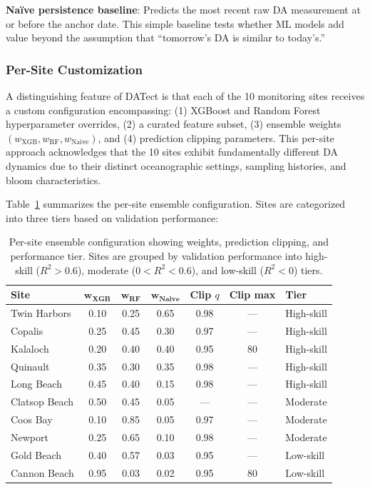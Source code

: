 \documentclass[preprint,12pt,authoryear]{elsarticle}
\begin{document}
\textbf{Na\"ive persistence baseline}: Predicts the most recent raw DA measurement at or before the anchor date. This simple baseline tests whether ML models add value beyond the assumption that ``tomorrow's DA is similar to today's.''

\subsubsection{Per-Site Customization}

A distinguishing feature of DATect is that each of the 10 monitoring sites receives a custom configuration encompassing: (1) XGBoost and Random Forest hyperparameter overrides, (2) a curated feature subset, (3) ensemble weights $(w_{\text{XGB}}, w_{\text{RF}}, w_{\text{Naive}})$, and (4) prediction clipping parameters. This per-site approach acknowledges that the 10 sites exhibit fundamentally different DA dynamics due to their distinct oceanographic settings, sampling histories, and bloom characteristics.

Table~\ref{tab:ensemble-config} summarizes the per-site ensemble configuration. Sites are categorized into three tiers based on validation performance:

\begin{table}[!htbp]
\centering
\caption{Per-site ensemble configuration showing weights, prediction clipping, and performance tier. Sites are grouped by validation performance into high-skill ($R^2 > 0.6$), moderate ($0 < R^2 < 0.6$), and low-skill ($R^2 < 0$) tiers.}
\label{tab:ensemble-config}
\small
\begin{tabular}{@{}lcccccl@{}}
\toprule
\textbf{Site} & $\boldsymbol{w_{\text{XGB}}}$ & $\boldsymbol{w_{\text{RF}}}$ & $\boldsymbol{w_{\text{Naive}}}$ & \textbf{Clip $q$} & \textbf{Clip max} & \textbf{Tier} \\
\midrule
Twin Harbors  & 0.10 & 0.25 & 0.65 & 0.98 & --- & High-skill \\
Copalis       & 0.25 & 0.45 & 0.30 & 0.97 & --- & High-skill \\
Kalaloch      & 0.20 & 0.40 & 0.40 & 0.95 & 80 & High-skill \\
Quinault      & 0.35 & 0.30 & 0.35 & 0.98 & --- & High-skill \\
Long Beach    & 0.45 & 0.40 & 0.15 & 0.98 & --- & High-skill \\
\addlinespace
Clatsop Beach & 0.50 & 0.45 & 0.05 & --- & --- & Moderate \\
Coos Bay      & 0.10 & 0.85 & 0.05 & 0.97 & --- & Moderate \\
Newport       & 0.25 & 0.65 & 0.10 & 0.98 & --- & Moderate \\
\addlinespace
Gold Beach    & 0.40 & 0.57 & 0.03 & 0.95 & --- & Low-skill \\
Cannon Beach  & 0.95 & 0.03 & 0.02 & 0.95 & 80 & Low-skill \\
\bottomrule
\end{tabular}
\end{table}
\end{document}
